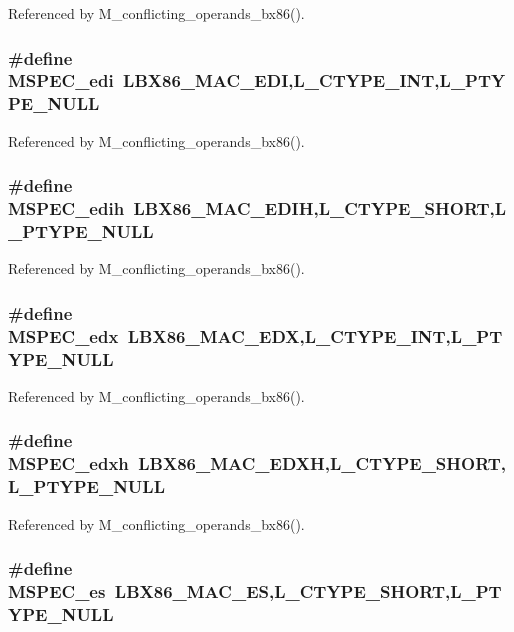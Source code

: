 Referenced by M\_\-conflicting\_\-operands\_\-bx86().
\subsubsection{\setlength{\rightskip}{0pt plus 5cm}\#define MSPEC\_\-edi~LBX86\_\-MAC\_\-EDI,L\_\-CTYPE\_\-INT,L\_\-PTYPE\_\-NULL}\label{ml__bx86_8c_40987cbca18e54c68d655aa45c2534b2}




Referenced by M\_\-conflicting\_\-operands\_\-bx86().
\subsubsection{\setlength{\rightskip}{0pt plus 5cm}\#define MSPEC\_\-edih~LBX86\_\-MAC\_\-EDIH,L\_\-CTYPE\_\-SHORT,L\_\-PTYPE\_\-NULL}\label{ml__bx86_8c_3c0e0cf76b20112f509249064a7e6a06}




Referenced by M\_\-conflicting\_\-operands\_\-bx86().
\subsubsection{\setlength{\rightskip}{0pt plus 5cm}\#define MSPEC\_\-edx~LBX86\_\-MAC\_\-EDX,L\_\-CTYPE\_\-INT,L\_\-PTYPE\_\-NULL}\label{ml__bx86_8c_f419e0c7391c0568f25cde158a464333}




Referenced by M\_\-conflicting\_\-operands\_\-bx86().
\subsubsection{\setlength{\rightskip}{0pt plus 5cm}\#define MSPEC\_\-edxh~LBX86\_\-MAC\_\-EDXH,L\_\-CTYPE\_\-SHORT,L\_\-PTYPE\_\-NULL}\label{ml__bx86_8c_d71a0ca656d2901921216aeac5739716}




Referenced by M\_\-conflicting\_\-operands\_\-bx86().
\subsubsection{\setlength{\rightskip}{0pt plus 5cm}\#define MSPEC\_\-es~LBX86\_\-MAC\_\-ES,L\_\-CTYPE\_\-SHORT,L\_\-PTYPE\_\-NULL}\label{ml__bx86_8c_29bcf596558134c690360cac9fb31c95}


